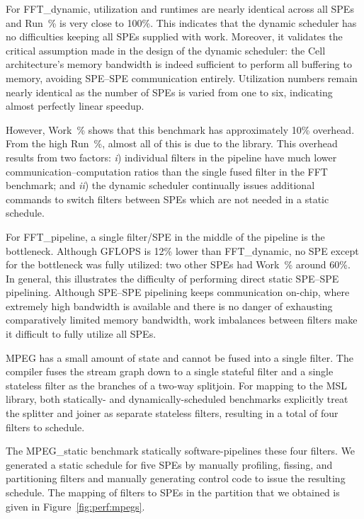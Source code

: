 For \textsf{FFT\_dynamic}, utilization and runtimes are nearly identical across all SPEs and Run~\% is very close to 100\%. This indicates that the dynamic scheduler has no difficulties keeping all SPEs supplied with work. Moreover, it validates the critical assumption made in the design of the dynamic scheduler: the Cell architecture's memory bandwidth is indeed sufficient to perform all buffering to memory, avoiding SPE--SPE communication entirely. Utilization numbers remain nearly identical as the number of SPEs is varied from one to six, indicating almost perfectly linear speedup. 

However, Work~\% shows that this benchmark has approximately 10\% overhead. From the high Run~\%, almost all of this is due to the library. This overhead results from two factors: \emph{i}) individual filters in the pipeline have much lower communication--computation ratios than the single fused filter in the \textsf{FFT} benchmark; and \emph{ii}) the dynamic scheduler continually issues additional commands to switch filters between SPEs which are not needed in a static schedule.

For \textsf{FFT\_pipeline}, a single filter/SPE in the middle of the pipeline is the bottleneck. Although GFLOPS is 12\% lower than \textsf{FFT\_dynamic}, no SPE except for the bottleneck was fully utilized: two other SPEs had Work~\% around 60\%. In general, this illustrates the difficulty of performing direct static SPE--SPE pipelining. Although SPE--SPE pipelining keeps communication on-chip, where extremely high bandwidth is available and there is no danger of exhausting comparatively limited memory bandwidth, work imbalances between filters make it difficult to fully utilize all SPEs.

MPEG has a small amount of state and cannot be fused into a single filter. The compiler fuses the stream graph down to a single stateful filter and a single stateless filter as the branches of a two-way splitjoin. For mapping to the MSL library, both statically- and dynamically-scheduled benchmarks explicitly treat the splitter and joiner as separate stateless filters, resulting in a total of four filters to schedule.

The \textsf{MPEG\_static} benchmark statically software-pipelines these four filters. We generated a static schedule for five SPEs by manually profiling, fissing, and partitioning filters and manually generating control code to issue the resulting schedule. The mapping of filters to SPEs in the partition that we obtained is given in Figure~\ref{fig:perf:mpegs}.

